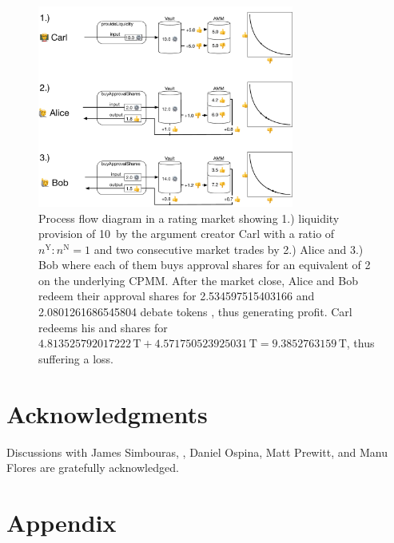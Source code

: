 \documentclass[%
aip,
amsmath,amssymb,
reprint,%
unsortedaddress,
nofootinbib
]{revtex4-2}
\newcommand{\T}{\text{T}}
\newcommand{\Y}{\text{Y}}
\newcommand{\N}{\text{N}}
\begin{document}
\begin{figure}
	\includegraphics[width=0.75\textwidth]{Graphics/RatingMarket.pdf}
	\caption{Process flow diagram in a rating market showing
		1.) liquidity provision of 10\,\T{} by the argument creator Carl with a ratio of $n^\Y:n^\N=1$
		and 
		two consecutive market trades by 
		2.) Alice and 
		3.) Bob where each of them buys approval shares for an equivalent of 2\,\T{} on the underlying \ac{CPMM}.
		After the market close, 
		Alice and Bob redeem their approval shares \Y{} for \num[round-mode=places,round-precision=1]{2.534597515403166}
		and
		\num[round-mode=places,round-precision=1]{2.0801261686545804}
		debate tokens \T{}, thus generating profit.
		Carl redeems his \Y{} and \N{} shares for
		$\num[round-mode=places,round-precision=1]{4.813525792017222}\,\T
		+\num[round-mode=places,round-precision=1]{4.571750523925031}\,\T
		=\num[round-mode=places,round-precision=1]{9.3852763159}\,\T$, thus suffering a loss.
	}
	\label{fig:RatingMarket}
\end{figure}

\section*{Acknowledgments}

Discussions
with 
James Simbouras,
,
Daniel Ospina,
Matt Prewitt, and 
Manu Flores
are gratefully acknowledged.


\section{Appendix}
\end{document}
